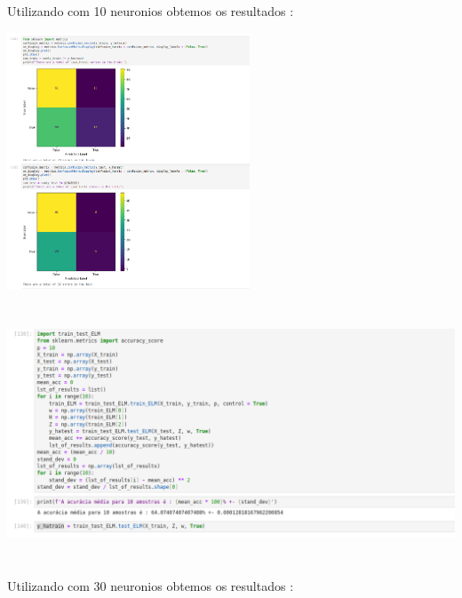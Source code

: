 \documentclass{article}
\begin{document}
\begin{center}
\begin{center}
\end{center}

\vspace{5pt}
Utilizando com 10 neuronios obtemos os resultados : 

\begin{center}

\includegraphics[height=3in]{Ex6/Hearth_Disease/conf_matrix_health_10.png}
\vspace{10pt}

\end{center}

\begin{center}

\includegraphics[height=3in]{Ex6/Hearth_Disease/acc_10.png}
\vspace{10pt}

\end{center}

\vspace{5pt}
Utilizando com 30 neuronios obtemos os resultados : 

\begin{center}


\end{center}
\end{center}
\end{document}
